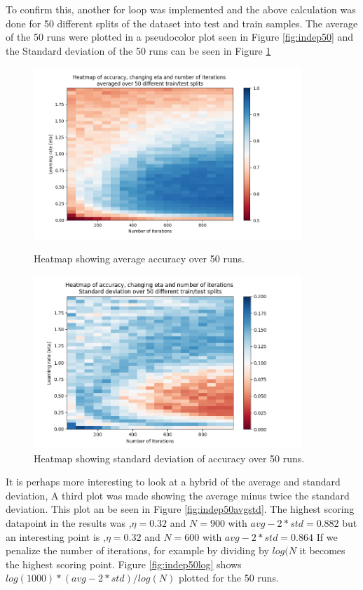 \documentclass{article}
\begin{document}
To confirm this, another for loop was implemented and the above calculation was done for 50 different splits of the dataset into test and train samples. The average of the 50 runs were plotted in a pseudocolor plot seen in Figure \ref{fig:indep50} and the Standard deviation of the 50 runs can be seen in Figure \ref{fig:indep50std}
\begin{figure}[H]
    \centering
    \includegraphics[width=0.9\textwidth]{05_backprop/indep50.png}
    \caption{Heatmap showing average accuracy over 50 runs.}
    \label{fig:indep50}
    \includegraphics[width=0.9\textwidth]{05_backprop/indep50std.png}
    \caption{Heatmap showing standard deviation of accuracy over 50 runs.}
    \label{fig:indep50std}
\end{figure}

\newpage
It is perhaps more interesting to look at a hybrid of the average and standard deviation, A third plot was made showing the average minus twice the standard deviation. This plot an be seen in Figure \ref{fig:indep50avgstd}. The highest scoring datapoint in the results was ,\(\eta=0.32\) and \(N=900\) with \(avg - 2*std = 0.882\) but an interesting point is ,\(\eta=0.32\) and \(N=600\) with \(avg - 2*std = 0.864\) If we penalize the number of iterations, for example by dividing by \(log(N\) it becomes the highest scoring point. Figure \ref{fig:indep50log} shows \(log(1000)*(avg-2*std)/log(N)\) plotted for the 50 runs.
\end{document}
